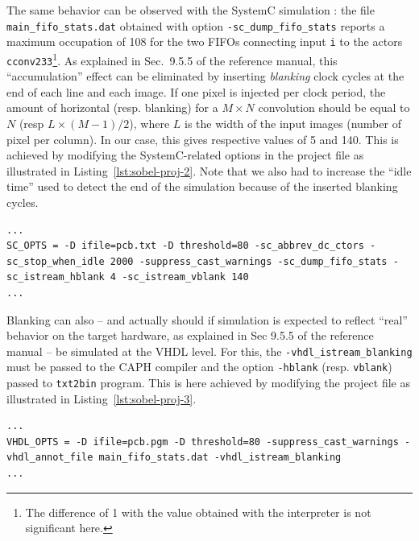 \medskip
The same behavior can be observed with the SystemC simulation : the file \verb|main_fifo_stats.dat|
obtained with option \verb|-sc_dump_fifo_stats| reports a maximum occupation of 108 for the two
FIFOs connecting input \texttt{i} to the actors \texttt{cconv233}\footnote{The difference of 1 with
  the value obtained with the interpreter is not significant here.}.  As explained in Sec.~9.5.5 of
the reference manual, this ``accumulation'' effect can be eliminated by inserting \emph{blanking}
clock cycles at the end of each line and each image. If one pixel is injected per clock period, the
amount of horizontal (resp. blanking) for a $M\times N$ convolution should be equal to $N$ (resp
$L\times (M-1)/2$), where $L$ is the width of the input images (number of pixel per column). In our
case, this gives respective values of 5 and 140. This is achieved by modifying the SystemC-related
options in the project file as
illustrated in Listing~\ref{lst:sobel-proj-2}. Note that we also had to increase the ``idle
time'' used to detect the end of the simulation because of the inserted blanking cycles.


\begin{lstlisting}[style=MakeStyle,caption={Modified project file for SystemC simulation (with
    centered convolution actors and blanking)},label={lst:sobel-proj-2}]
...
SC_OPTS = -D ifile=pcb.txt -D threshold=80 -sc_abbrev_dc_ctors -sc_stop_when_idle 2000 -suppress_cast_warnings -sc_dump_fifo_stats -sc_istream_hblank 4 -sc_istream_vblank 140
...
\end{lstlisting}

\medskip
Blanking can also -- and actually should if simulation is expected to reflect ``real'' behavior on the
target hardware, as explained in Sec 9.5.5 of the reference manual -- be simulated at the VHDL
level. For this, the \verb|-vhdl_istream_blanking| must be passed to the CAPH compiler and the
option \texttt{-hblank} (resp. \texttt{vblank}) passed to \texttt{txt2bin} program. This is here
achieved by modifying the project file as illustrated in Listing~\ref{lst:sobel-proj-3}.

\begin{lstlisting}[style=MakeStyle,caption={Modified project file for VHDL simulation (with
    centered convolution actors and blanking)},label={lst:sobel-proj-3}]
...
VHDL_OPTS = -D ifile=pcb.pgm -D threshold=80 -suppress_cast_warnings -vhdl_annot_file main_fifo_stats.dat -vhdl_istream_blanking
...
\end{lstlisting}

